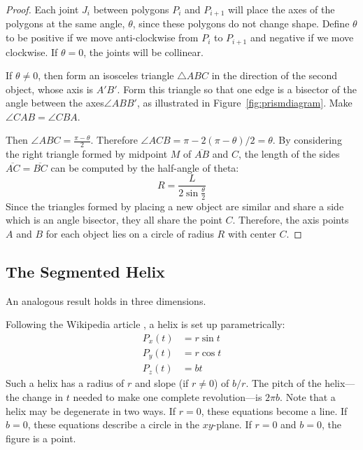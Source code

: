 \documentclass[mathematics,article,submit,pdftex,moreauthors]{Definitions/mdpi}
\begin{document}
\begin{proof}

Each joint $J_i$ between polygons $P_i$ and $P_{i+1}$ will place the axes of the polygons at the same angle, $\theta$, since
these polygons do not change shape. Define $\theta$ to be positive
if we move anti-clockwise from $P_i$ to $P_{i+1}$ and negative if we move clockwise.
If $\theta = 0$, the joints will be collinear.

If $\theta \neq 0$, then form an isosceles triangle $\triangle{ABC}$ in the direction of the second
object, whose axis is $A'B'$.
Form this triangle so that one edge is a bisector of the angle between the axes$\angle ABB'$,
as illustrated in Figure~\ref{fig:prismdiagram}.
Make $\angle CAB = \angle CBA$.

Then $\angle ABC = \frac{\pi - \theta}{2}$. Therefore $\angle ACB = \pi - 2(\pi-\theta)/2 = \theta$.
By considering the right triangle formed by midpoint $M$ of $\overline{AB}$ and $C$,
the length of the sides $\overline{AC} = \overline{BC}$ can be computed by the half-angle
of theta:
\[
R = \frac{L}{2 \sin{\frac{\theta}{2}}}
\]
Since the triangles formed by placing a new object are similar and share a side which
is an angle bisector, they all share the point $C$. Therefore, the axis points $A$ and $B$
for each object lies on a circle of radius $R$ with center $C$.
\end{proof}


\label{sec:2d}

\subsection{The Segmented Helix}

An analogous result holds in three dimensions.

Following the Wikipedia article \cite{wiki:helix},
a helix is set up parametrically:
\begin{align}
    P_x(t) &= r \sin{t}  \\
    P_y(t) &= r \cos{t} \\
   P_z(t) &= b t
\end{align}
Such a helix has a radius of $r$ and slope (if $r \neq 0$) of $b/r$.
The pitch of the helix---the change in $t$ needed to make one complete revolution---is $2\pi b$.
Note that a helix may be degenerate in two ways.
If $r = 0$, these equations become a line. If $b = 0$, these equations describe a circle in the $xy$-plane.
If $r = 0$ and $b = 0$, the figure is a point.
\end{document}
